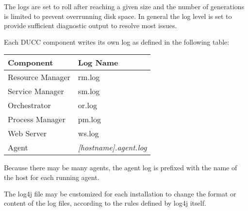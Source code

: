     The logs are set to roll after reaching a given size and the number of generations
    is limited to prevent overrunning disk space.  In general the log level is set to
    provide sufficient diagnostic output to resolve most issues.

    Each DUCC component writes its own log as defined in the following table:

    \begin{tabular} {| l | l |}
       \hline
          Component & Log Name \\
      \hline
      \hline
          Resource Manager & rm.log \\
      \hline
          Service Manager & sm.log \\
      \hline
          Orchestrator & or.log \\
      \hline
          Process Manager & pm.log \\
      \hline
          Web Server & ws.log \\
      \hline
          Agent & {\em [hostname].agent.log } \\
      \hline
    \end{tabular}
    
    Because there may be many agents, the agent log is prefixed with the name of the host for
    each running agent.

    The log4j file may be customized for each installation to change the format or content of the
    log files, according to the rules defined by log4j itself.

